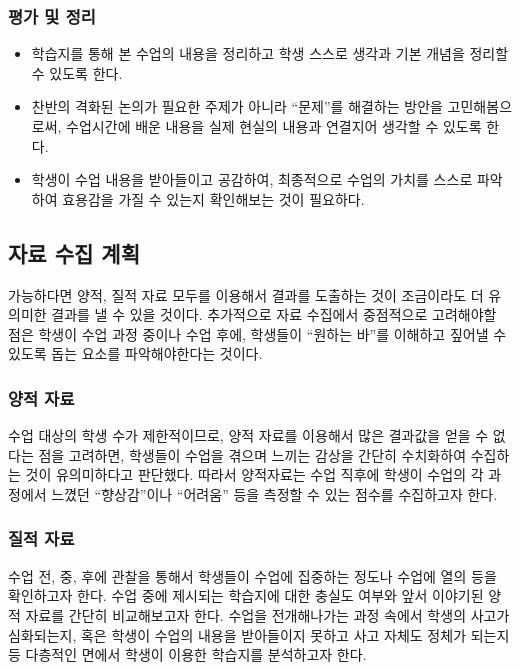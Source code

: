 \documentclass[10pt, a4paper]{oblivoir}
\begin{document}
        \subsubsection{평가 및 정리}
        \begin{itemize}[-]
            \item 학습지를 통해 본 수업의 내용을 정리하고 학생 스스로 생각과 기본 개념을 정리할 수 있도록 한다. 
            \item 찬반의 격화된 논의가 필요한 주제가 아니라 ``문제''를 해결하는 방안을 고민해봄으로써, 수업시간에 배운 내용을 실제 현실의 내용과 연결지어 생각할 수 있도록 한다. 
            \item 학생이 수업 내용을 받아들이고 공감하여, 최종적으로 수업의 가치를 스스로 파악하여 효용감을 가질 수 있는지 확인해보는 것이 필요하다. 
        \end{itemize}

        \subsection{자료 수집 계획}
        가능하다면 양적, 질적 자료 모두를 이용해서 결과를 도출하는 것이 조금이라도 더 유의미한 결과를 낼 수 있을 것이다. 추가적으로 자료 수집에서
        중점적으로 고려해야할 점은 학생이 수업 과정 중이나 수업 후에, 학생들이 ``원하는 바''를 이해하고 짚어낼 수 있도록 돕는 요소를 파악해야한다는 것이다.
        \subsubsection*{양적 자료}
        수업 대상의 학생 수가 제한적이므로, 양적 자료를 이용해서 많은 결과값을 얻을 수 없다는 점을 고려하면, 학생들이 
        수업을 겪으며 느끼는 감상을 간단히 수치화하여 수집하는 것이 유의미하다고 판단했다. 따라서 양적자료는 수업 직후에 
        학생이 수업의 각 과정에서 느꼈던 ``향상감''이나 ``어려움'' 등을 측정할 수 있는 점수를 수집하고자 한다. 
        \subsubsection*{질적 자료}
        수업 전, 중, 후에 관찰을 통해서 학생들이 수업에 집중하는 정도나 수업에 열의 등을 확인하고자 한다. 수업 중에 
        제시되는 학습지에 대한 충실도 여부와 앞서 이야기된 양적 자료를 간단히 비교해보고자 한다. 수업을 전개해나가는 과정 속에서 
        학생의 사고가 심화되는지, 혹은 학생이 수업의 내용을 받아들이지 못하고 사고 자체도 정체가 되는지 등 다층적인 면에서 학생이 
        이용한 학습지를 분석하고자 한다. 

\pagebreak



\printbibliography
\end{document}
